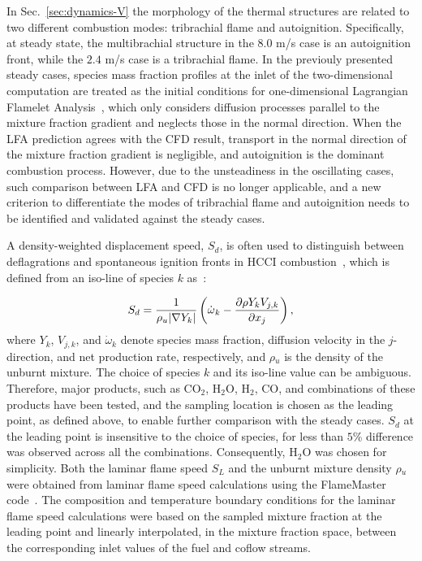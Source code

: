 In Sec.~\ref{sec:dynamics-V} the morphology of the thermal structures are related to two different combustion modes: tribrachial flame and autoignition.  Specifically, at steady state, the multibrachial structure in the $8.0$ m/s case is an autoignition front, while the $2.4$ m/s case is a tribrachial flame.  In the previouly presented steady cases, species mass fraction profiles at the inlet of the two-dimensional computation are treated as the initial conditions for one-dimensional Lagrangian Flamelet Analysis~\cite{pitsch98a}, which only considers diffusion processes parallel to the mixture fraction gradient and neglects those in the normal direction.  When the LFA prediction agrees with the CFD result, transport in the normal direction of the mixture fraction gradient is negligible, and autoignition is the dominant combustion process.  However, due to the unsteadiness in the oscillating cases, such comparison between LFA and CFD is no longer applicable, and a new criterion to differentiate the modes of tribrachial flame and autoignition needs to be identified and validated against the steady cases.

A density-weighted displacement speed, $S_d$, is often used to distinguish between deflagrations and spontaneous ignition fronts in HCCI combustion~\cite{yoo13}, which is defined from an iso-line of species $k$ as~\cite{ruetsch95,im99}:

\begin{equation} \label{eq:sd}
S_d = \frac{1}{\rho{_u} |\nabla Y_k|} \left(\dot{\omega}{_k} - \frac{\partial \rho Y_k V_{j,k}}{\partial x_j} \right),
\end{equation}
where $Y_k$, $V_{j,k}$, and $\dot{\omega}{_k}$ denote species mass fraction, diffusion velocity in the $j$-direction, and net production rate, respectively, and $\rho {_u}$ is the density of the unburnt mixture.  The choice of species $k$ and its iso-line value can be ambiguous.  Therefore, major products, such as CO$_2$, H$_2$O, H$_2$, CO, and combinations of these products have been tested, and the sampling location is chosen as the leading point, as defined above, to enable further comparison with the steady cases.  $S_d$ at the leading point is insensitive to the choice of species, for less than $5$\% difference was observed across all the combinations.  Consequently, H$_2$O was chosen for simplicity.  Both the laminar flame speed $S_L$ and the unburnt mixture density $\rho {_u}$ were obtained from laminar flame speed calculations using the FlameMaster code~\cite{flamemaster}.  The composition and temperature boundary conditions for the laminar flame speed calculations were based on the sampled mixture fraction at the leading point and linearly interpolated, in the mixture fraction space, between the corresponding inlet values of the fuel and coflow streams.  

